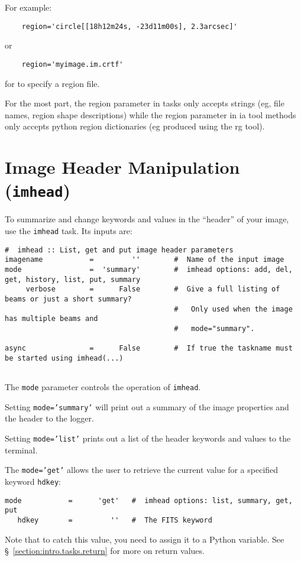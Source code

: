 For example: 
\small
\begin{verbatim}
    region='circle[[18h12m24s, -23d11m00s], 2.3arcsec]'
\end{verbatim}
\normalsize

or

\small
\begin{verbatim}
    region='myimage.im.crtf'
\end{verbatim}
\normalsize

for to specify a region file. 


For the most part, the region parameter in tasks only
accepts strings (eg, file names, region shape descriptions) while the
region parameter in ia tool methods only accepts python region
dictionaries (eg produced using the rg tool).


\section{Image Header Manipulation ({\tt imhead})}
\label{section:analysis.imhead}

To summarize and change keywords and values in the ``header'' of
your image, use the {\tt imhead} task.  Its inputs are:
\small
\begin{verbatim}
#  imhead :: List, get and put image header parameters
imagename           =         ''        #  Name of the input image
mode                =  'summary'        #  imhead options: add, del, get, history, list, put, summary
     verbose        =      False        #  Give a full listing of beams or just a short summary? 
                                        #   Only used when the image has multiple beams and
                                        #   mode="summary".

async               =      False        #  If true the taskname must be started using imhead(...)


\end{verbatim}
\normalsize

The {\tt mode} parameter controls the operation of {\tt imhead}.

Setting {\tt mode='summary'} will print out a summary of the image
properties and the header to the logger.

Setting {\tt mode='list'} prints out a list of the header keywords
and values to the terminal.

The {\tt mode='get'} allows the user to retrieve the current value 
for a specified keyword {\tt hdkey}:
\small
\begin{verbatim}
mode           =      'get'   #  imhead options: list, summary, get, put
   hdkey       =         ''   #  The FITS keyword
\end{verbatim}
\normalsize
Note that to catch this value, you need to assign it to a Python
variable.
See \S~\ref{section:intro.tasks.return} for more on return values.

